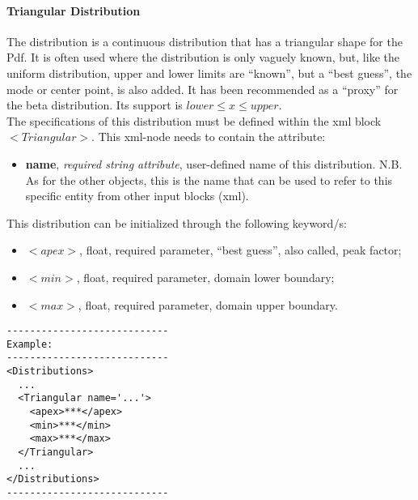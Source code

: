 \paragraph{Triangular Distribution}
\label{Triangular}
The  distribution is a continuous distribution that has a triangular shape for the Pdf. It is often used where the distribution is only vaguely known, but, like the uniform distribution, upper and lower limits are ``known'', but a ``best guess'', the mode or center point, is also added. It has been recommended as a ``proxy'' for the beta distribution. Its support is $lower \le x \le upper$.
\\ The specifications of this distribution must be defined within the xml block $<Triangular>$. This xml-node needs to contain the attribute:
\vspace{-5mm}
\begin{itemize}
\itemsep0em
\item \textbf{name}, \textit{required string attribute}, user-defined name of this distribution. N.B. As for the other objects, this is the name that can be used to refer to this specific entity from other input blocks (xml).   
\end{itemize}
\vspace{-5mm}
This distribution can be initialized through the following keyword/s:
\begin{itemize}
\item $<apex>$, float, required parameter, ``best guess'', also called, peak factor;
\item $<min>$, float, required parameter, domain lower boundary;
\item $<max>$, float, required parameter, domain upper boundary.
\end{itemize}

\begin{lstlisting}[style=XML]
----------------------------
Example:
----------------------------
<Distributions>
  ...
  <Triangular name='...'>
    <apex>***</apex>
    <min>***</min>
    <max>***</max>
  </Triangular>
  ...
</Distributions>
----------------------------
\end{lstlisting}

